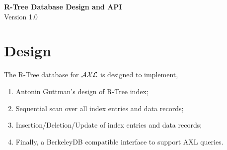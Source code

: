 \documentclass[12pt]{article}
\newcommand{\AXL}{$\cal AXL$}
\begin{document}

\setcounter{page}{1}

\begin{center}
{\LARGE \bf R-Tree Database Design and API}\\
Version 1.0\\
\end{center}





\section{Design}

The R-Tree database for {\AXL} is designed to implement,
\begin{enumerate}
\item Antonin Guttman's design of R-Tree index;
\item Sequential scan over all index entries and data records;
\item Insertion/Deletion/Update of index entries and data records;
\item Finally, a BerkeleyDB compatible interface to support AXL
      queries.
\end{enumerate}
\end{document}

